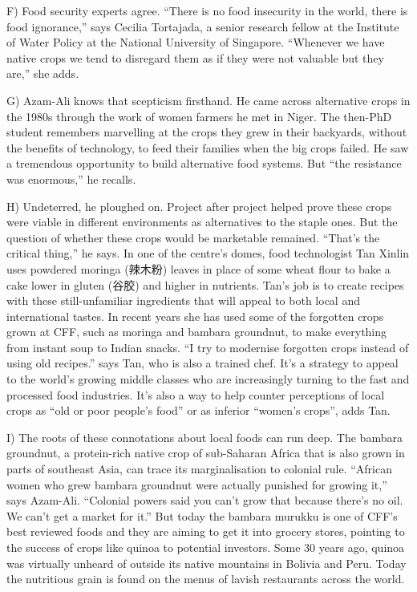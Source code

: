 \documentclass[UTF8,11pt]{ctexart}
\begin{document}
F) Food security experts agree. “There is no food insecurity in the world, there is food ignorance,” says Cecilia Tortajada, a senior research fellow at the Institute of Water Policy at the National University of Singapore. “Whenever we have native crops we tend to disregard them as if they were not valuable but they are,” she adds.


G) Azam-Ali knows that scepticism firsthand. He came across alternative crops in the 1980s through the work of women farmers he met in Niger. The then-PhD student remembers marvelling at the crops they grew in their backyards, without the benefits of technology, to feed their families when the big crops failed. He saw a tremendous opportunity to build alternative food systems. But “the resistance was enormous,” he recalls.


H) Undeterred, he ploughed on. Project after project helped prove these crops were viable in different environments as alternatives to the staple ones. But the question of whether these crops would be marketable remained. “That’s the critical thing,” he says. In one of the centre’s domes, food technologist Tan Xinlin uses powdered moringa (辣木粉) leaves in place of some wheat flour to bake a cake lower in gluten (谷胶) and higher in nutrients. Tan’s job is to create recipes with these still-unfamiliar ingredients that will appeal to both local and international tastes. In recent years she has used some of the forgotten crops grown at CFF, such as moringa and bambara groundnut, to make everything from instant soup to Indian snacks. “I try to modernise forgotten crops instead of using old recipes.” says Tan, who is also a trained chef. It’s a strategy to appeal to the world’s growing middle classes who are increasingly turning to the fast and processed food industries. It’s also a way to help counter perceptions of local crops as “old or poor people’s food” or as inferior “women’s crops”, adds Tan.


I) The roots of these connotations about local foods can run deep. The bambara groundnut, a protein-rich native crop of sub-Saharan Africa that is also grown in parts of southeast Asia, can trace its marginalisation to colonial rule. “African women who grew bambara groundnut were actually punished for growing it,” says Azam-Ali. “Colonial powers said you can’t grow that because there’s no oil. We can’t get a market for it.” But today the bambara murukku is one of CFF’s best reviewed foods and they are aiming to get it into grocery stores, pointing to the success of crops like quinoa to potential investors. Some 30 years ago, quinoa was virtually unheard of outside its native mountains in Bolivia and Peru. Today the nutritious grain is found on the menus of lavish restaurants across the world.
\end{document}
